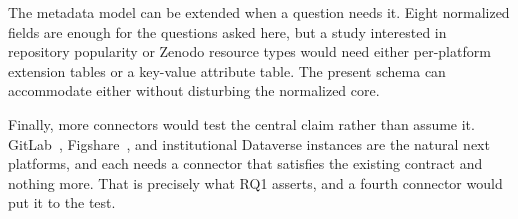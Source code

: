 The metadata model can be extended when a question needs it. Eight normalized fields are enough for the questions asked here, but a study interested in repository popularity or Zenodo resource types would need either per-platform extension tables or a key-value attribute table. The present schema can accommodate either without disturbing the normalized core.

Finally, more connectors would test the central claim rather than assume it. GitLab~\cite{gitlabdocs}, Figshare~\cite{figshare}, and institutional Dataverse instances are the natural next platforms, and each needs a connector that satisfies the existing contract and nothing more. That is precisely what RQ1 asserts, and a fourth connector would put it to the test.
